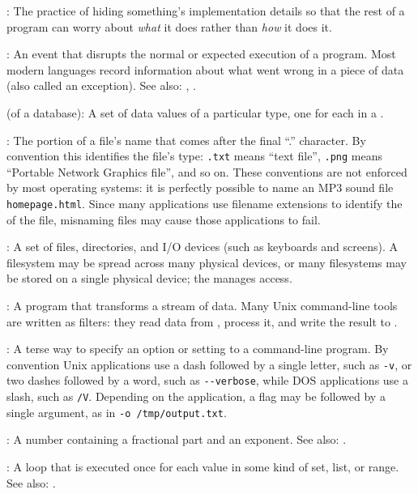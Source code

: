 :
The practice of hiding something's
implementation details so that the rest of a program can worry about
\emph{what} it does rather than \emph{how} it does it.

:
An event that disrupts the normal or expected execution of a program.
Most modern languages record information about what went wrong
in a piece of data (also called an exception).
See also: , .

 (of a database):
A set of data values of a particular
type, one for each  in a
.

:
The portion of a file's name that comes
after the final ``.'' character. By convention this identifies the
file's type: \texttt{.txt} means ``text file'', \texttt{.png} means
``Portable Network Graphics file'', and so on. These conventions are not
enforced by most operating systems: it is perfectly possible to name an
MP3 sound file \texttt{homepage.html}. Since many applications use
filename extensions to identify the  of
the file, misnaming files may cause those applications to fail.

:
A set of files, directories, and I/O devices (such
as keyboards and screens). A filesystem may be spread across many
physical devices, or many filesystems may be stored on a single physical
device; the  manages
access.

:
A program that transforms a stream of data. Many Unix
command-line tools are written as filters: they read data from
, process it, and write the
result to .

:
A terse way to specify an option or setting to a
command-line program. By convention Unix applications use a dash
followed by a single letter, such as \texttt{-v}, or two dashes followed
by a word, such as \texttt{-{}-verbose}, while DOS applications use a
slash, such as \texttt{/V}. Depending on the application, a flag may be
followed by a single argument, as in \texttt{-o /tmp/output.txt}.

:
A number containing a fractional
part and an exponent. See also: .

:
A loop that is executed once for each value in some
kind of set, list, or range. See also: .

